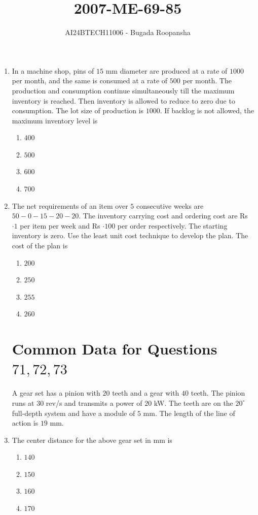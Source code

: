 \documentclass[journal,12pt,twocolumn]{IEEEtran}
\theoremstyle{remark}
\begin{document}

\vspace{3cm}
\title{2007-ME-69-85}
\author{AI24BTECH11006 - Bugada Roopansha}
\maketitle
\begin{enumerate}[start=69]
\item In a machine shop, pins of $15$ mm diameter are produced at a rate of $1000$ per month, and the same is consumed at a rate of $500$ per month. The production and consumption continue simultaneously till the maximum inventory is reached. Then inventory is allowed to reduce to zero due to consumption. The lot size of production is $1000$. If backlog is not allowed, the maximum inventory level is
\begin{enumerate}
    \item $400$
    \item $500$
    \item $600$
    \item $700$
\end{enumerate}
\item The net requirements of an item over $5$ consecutive weeks are $50-0-15-20-20$. The inventory carrying cost and ordering cost are Rs $\cdot1$ per item per week and Rs $\cdot100$ per order respectively. The starting inventory is zero. Use the least unit cost technique to develop the plan. The cost of the plan  is
    \begin{enumerate}
        \item $200$
        \item $250$
        \item $255$
        \item $260$
    \end{enumerate}
\section{Common Data for Questions$ 71, 72, 73$}    
A gear set has a pinion with $20$ teeth and a gear with $40$ teeth. The pinion runs at $30$ rev/s and transmits a power of $20$ kW. The teeth are on the $20^\circ$ full-depth system and have a module of $5$ mm. The length of the line of action is $19$ mm.
    \item The center distance for the above gear set in mm is
    \begin{enumerate}
        \item $140$
        \item $150$
        \item $160$
        \item $170$
    \end{enumerate}
    

\end{enumerate}
\end{document}
